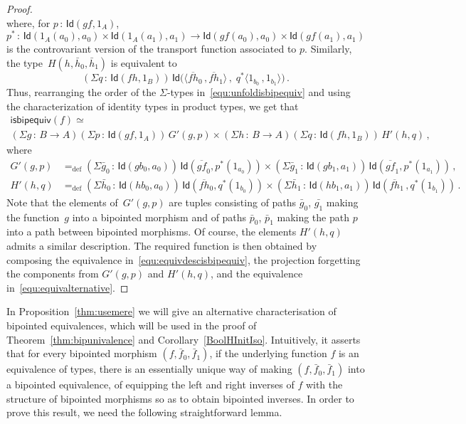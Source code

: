 \documentclass[10pt,a4paper,oneside,reqno]{amsart}
\numberwithin{equation}{section}
\theoremstyle{mythm}
\theoremstyle{mydef}
\theoremstyle{myrmk}
\newcommand{\ie}{\text{i.e.\ }}
\newcommand{\defeq}{=_{\mathrm{def}}}
\newcommand{\co}{\,{:}\,}
\newcommand{\Id}{\mathsf{Id}}
\newcommand{\isbipequiv}{\mathsf{isbipequiv}}
\begin{document}
\begin{proof}
\[\]
where, for $p \co \Id(gf, 1_A)$, 
\[
p^* \co \Id( 1_A(a_0), a_0) \times \Id(1_A(a_1), a_1) \to \Id( gf(a_0), a_0) \times \Id( gf(a_1), a_1) 
\]
is the controvariant version of the transport function associated to $p$. Similarly, the type~$H(h, \bar{h}_0, \bar{h}_1)$ is equivalent to 
\[
(\Sigma q \co  \Id( f h, 1_B)) \, 
\Id 
\big(  
\langle 
\overline{fh}_0  \, ,    \overline{fh}_1 
\rangle \, ,  \; 
 q^*
 \langle 
 1_{b_0} \, , 1_{b_1}  
 \rangle  
 \big) \, .
\]
Thus, rearranging the order of the $\Sigma$-types in~\eqref{equ:unfoldisbipequiv} and using the
characterization of identity types in product types, we get that 
\begin{multline}
\label{equ:equivdescisbipequiv}
\isbipequiv(f) \simeq  \\ (\Sigma g \co B \to A)(\Sigma p \co \Id(gf, 1_A))\,  G'(g,p) \times
(\Sigma h \co B \to A)(\Sigma q \co \Id(fh, 1_B))\, H'(h,q) \, , 
\end{multline}
where 
\begin{align} 
G'(g,p) & \defeq 
(\Sigma \bar{g}_0 \co \Id( g b_0, a_0)) \, \Id( \overline{gf}_0, p^*(1_{a_0}) ) \times 
(\Sigma  \bar{g}_1 \co \Id( g b_1, a_1)) \, \Id( \overline{gf}_1, p^*(1_{a_1}) ) \, ,
 \label{equ:bipgp} \\
 H'(h,q) & \defeq 
 (\Sigma \bar{h}_0 \co \Id ( h b_0,  a_0)) \, \Id ( \overline{fh}_0 , q^*(1_{b_0})) \times 
 (\Sigma \bar{h}_1 \co  \Id ( h b_1,  a_1)) \, \Id (   \overline{fh}_1 \, ,  q^*(1_{b_1})) \, .  \label{equ:biphq}
 \end{align} 
 Note that the elements of~$G'(g,p)$ are tuples consisting of paths $\bar{g}_0$, $\bar{g_1}$ making the function~$g$ into a bipointed morphism and of paths $\bar{p}_0$, $\bar{p}_1$ making the path $p$ into a path between
bipointed morphisms. Of course, the elements $H'(h,q)$ admits a similar description. 
The required  function  is then obtained 
by composing the equivalence in~\eqref{equ:equivdescisbipequiv}, the projection 
forgetting the components from $G'(g,p)$ and $H'(h,q)$, and the equivalence in~\eqref{equ:equivalternative}.
\end{proof} 


In Proposition~\ref{thm:usemere} we will give an alternative characterisation of bipointed 
equivalences, which will be used in the proof of Theorem~\ref{thm:bipunivalence} and Corollary~\ref{BoolHInitIso}.
Intuitively, it asserts that for every bipointed morphism $(f, \bar{f}_0, \bar{f}_1)$, 
 if the underlying function $f$  is an equivalence of types, there is an 
essentially unique way of making $(f, \bar{f}_0, \bar{f}_1)$ into a bipointed equivalence, \ie of equipping the left and right inverses of $f$ with the structure of bipointed morphisms so as to obtain bipointed inverses. In order to prove this result,
we need the following straightforward lemma.
\end{document}
